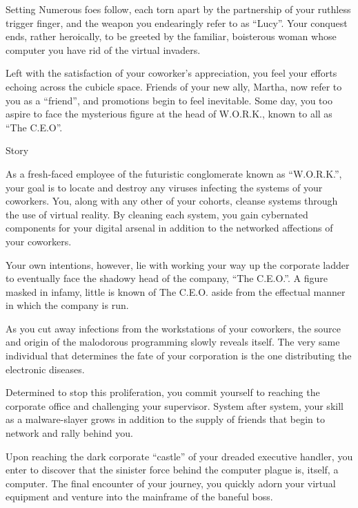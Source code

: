\documentclass[12pt]{report}
\begin{document}
\begin{section}{Setting}
Numerous foes follow, each torn apart by the partnership of your ruthless trigger finger, 
and the weapon you endearingly refer to as ``Lucy''. Your conquest ends, rather heroically, 
to be greeted by the familiar, boisterous woman whose computer you have rid of the virtual 
invaders.

Left with the satisfaction of your coworker's appreciation, you feel your efforts echoing 
across the cubicle space. Friends of your new ally, Martha, now refer to you as a ``friend'', 
and promotions begin to feel inevitable. Some day, you too aspire to face the mysterious 
figure at the head of W.O.R.K., known to all as ``The C.E.O''.


\end{section}

\begin{section}{Story}

\hspace{1.5em}As a fresh-faced employee of the futuristic conglomerate known as ``W.O.R.K.'', 
your goal is to locate and destroy any viruses infecting the systems of your coworkers. You, 
along with any other of your cohorts, cleanse systems through the use of virtual reality. By 
cleaning each system, you gain cybernated components for your digital arsenal in addition to 
the networked affections of your coworkers.

Your own intentions, however, lie with working your way up the corporate ladder to eventually 
face the shadowy head of the company, ``The C.E.O.''. A figure masked in infamy, little is 
known of The C.E.O. aside from the effectual manner in which the company is run.

As you cut away infections from the workstations of your coworkers, the source and origin of 
the malodorous programming slowly reveals itself. The very same individual that determines the 
fate of your corporation is the one distributing the electronic diseases.
\newline

Determined to stop this proliferation, you commit yourself to reaching the corporate office 
and challenging your supervisor. System after system, your skill as a malware-slayer grows 
in addition to the supply of friends that begin to network and rally behind you.

Upon reaching the dark corporate ``castle'' of your dreaded executive handler, you enter to 
discover that the sinister force behind the computer plague is, itself, a computer. The final 
encounter of your journey, you quickly adorn your virtual equipment and venture into the 
mainframe of the baneful boss.


\end{section}
\end{document}
